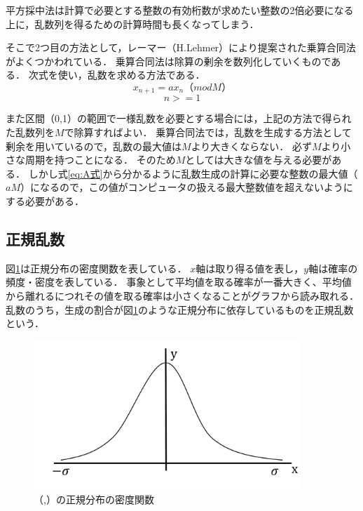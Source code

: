 \documentclass[12pt,a4j]{ltjsarticle}
\begin{document}
平方採中法は計算で必要とする整数の有効桁数が求めたい整数の2倍必要になる上に，乱数列を得るための計算時間も長くなってしまう．

そこで2つ目の方法として，レーマー（H.Lehmer）により提案された乗算合同法がよくつかわれている．
乗算合同法は除算の剰余を数列化していくものである．
次式を使い，乱数を求める方法である．
\begin{equation}
   x_{n+1} = ax_n（mod M ）\tag{A}
   \label{eq:A式}
\end{equation}
\begin{equation}
  n >= 1  \tag{B}
  \label{eq:B式}
\end{equation}

また区間（0,1）の範囲で一様乱数を必要とする場合には，上記の方法で得られた乱数列を$M$で除算すればよい．
乗算合同法では，乱数を生成する方法として剰余を用いているので，乱数の最大値は$M$より大きくならない．
必ず$M$より小さな周期を持つことになる．
そのため$M$としては大きな値を与える必要がある．
しかし式\ref{eq:A式}から分かるように乱数生成の計算に必要な整数の最大値（$aM$）になるので，この値がコンピュータの扱える最大整数値を超えないようにする必要がある．

\clearpage

\subsection{正規乱数}
図\ref{fig:正規乱数}は正規分布の密度関数を表している．
$x$軸は取り得る値を表し，$y$軸は確率の頻度・密度を表している．
事象として平均値を取る確率が一番大きく、平均値から離れるにつれその値を取る確率は小さくなることがグラフから読み取れる．
乱数のうち，生成の割合が図\ref{fig:正規乱数}のような正規分布に依存しているものを正規乱数という．
\vspace{8mm}
\begin{figure}[h]
\begin{center}
\includegraphics[width = 100mm ] {figures/seikir.pdf}
\caption{（\mu,\sigma）の正規分布の密度関数}
\label{fig:正規乱数}
\end{center}
\end{figure}
\end{document}
